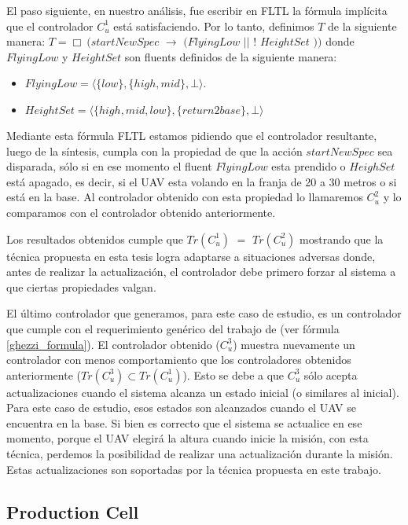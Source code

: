 El paso siguiente, en nuestro análisis, fue escribir en FLTL la fórmula implícita que el controlador $C_u^1$ está
satisfaciendo. Por lo tanto, definimos $T$ de la siguiente manera: $T = \Box\ (startNewSpec$
$\rightarrow$ $(FlyingLow$ $||$ $!$ $HeightSet$ $))$ donde $FlyingLow$ y $HeightSet$ son fluents definidos de la siguiente manera: 

\begin{itemize}
\itemsep-4mm
\item $FlyingLow = \langle \{low\},\{high,mid\},\bot\rangle$.
\item $HeightSet = \langle \{high,mid,low\},\{return2base\},\bot\rangle$
\end{itemize}

Mediante esta fórmula FLTL estamos pidiendo que el controlador resultante, luego de la síntesis, cumpla con la propiedad
de que la acción $startNewSpec$ sea disparada, sólo si en ese momento el fluent $FlyingLow$ esta prendido o $HeighSet$
está apagado, es decir, si el UAV esta volando en la franja de 20 a 30 metros o si está en la base. Al controlador
obtenido con esta propiedad lo llamaremos $C_u^2$ y lo comparamos con el controlador obtenido anteriormente.

Los resultados obtenidos cumple que $Tr(C_u^1)$ $=$ $Tr(C_u^2)$ mostrando que la técnica propuesta en esta tesis logra
adaptarse a situaciones adversas donde, antes de realizar la actualización, el controlador debe primero forzar al
sistema a que ciertas propiedades valgan.

El último controlador que generamos, para este caso de estudio, es un controlador que cumple con el requerimiento genérico
del trabajo de \cite{6224401} (ver fórmula \ref{ghezzi_formula}). El controlador obtenido ($C_u^3$) muestra nuevamente
un controlador con menos comportamiento que los controladores obtenidos anteriormente ($Tr(C_u^3) \subset Tr(C_u^1)$).
Esto se debe a que $C_u^3$ sólo acepta actualizaciones cuando el sistema alcanza un estado inicial (o similares al
inicial). Para este caso de estudio, esos estados son alcanzados cuando el UAV se encuentra en la base. Si bien es
correcto que el sistema se actualice en ese momento, porque el UAV elegirá la altura cuando inicie la misión, con esta
técnica, perdemos la posibilidad de realizar una actualización durante la misión. Estas actualizaciones son
soportadas por la técnica propuesta en este trabajo.

\subsection{Production Cell}

